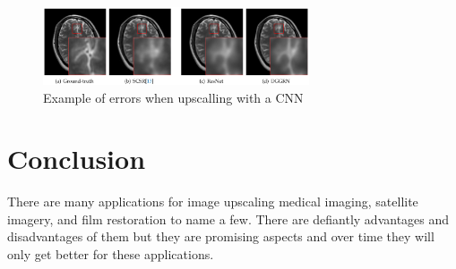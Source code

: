 \documentclass{article}
\begin{document}
\begin{figure}[h]
    \centering
    \includegraphics[width=0.7\textwidth]{applsci-09-04874-g001}
    \caption{Example of errors when upscalling with a CNN \cite{Du2019}}
    \label{fig:brain}
\end{figure}


\section{Conclusion}

There are many applications for image upscaling medical imaging, satellite imagery, and film restoration to name a few. There are defiantly advantages and disadvantages of them but they are promising aspects and over time they will only get better for these applications. 




\end{document}
